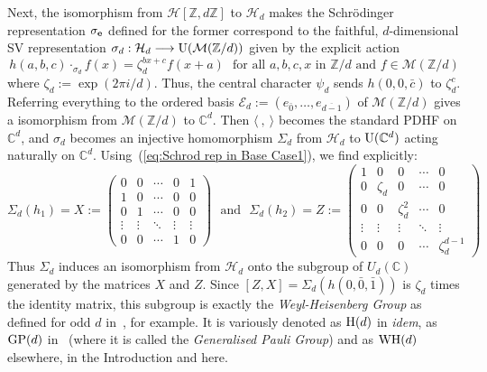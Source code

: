 \documentclass[12pt]{article}
\newcounter{example}[section]
\newcommand{\addwords}[1]{\ \ \ \mbox{#1}}
\newcommand{\bbC}{\ensuremath{\mathbb{C}}}\newcommand{\bbCp}{\ensuremath{\mathbb{C}_p}}
\newcommand{\bbZ}{\ensuremath{\mathbb{Z}}}
\newcommand{\be}{\ensuremath{{\bf e}}}
\newcommand{\cE}{\ensuremath{\mathcal{E}}}
\newcommand{\cH}{\ensuremath{\mathcal{H}}}
\newcommand{\cM}{\mathcal{M}}
\newcommand{\U}{{\rm U}}
\newcommand{\Zover}[1]{\ensuremath{\bbZ/#1}}
\begin{document}
Next, the isomorphism from $\cH[\bbZ,d\bbZ]$ to $\cH_d$ makes the Schr\"odinger representation $\sigma_\be$ defined for the former correspond to the faithful, $d$-dimensional SV representation
$
\sigma_d: \cH_d \longrightarrow 
\U(\cM(\Zover{d})) 
$
given by the explicit action 
\begin{equation}\label{eq:Schrod rep in Base Case1}
	h(a,b,c)\cdot_{\sigma_d} f(x)=\zeta_d^{bx+c}f(x+a)
	\addwords{for all $a,b,c,x$ in $\Zover{d}$ and $f\in\cM(\Zover{d})$}
\end{equation}
where $\zeta_d:=\exp(2\pi i/d)$. Thus, the 
central character $\psi_d$ sends $h(0,0,\bar c)$ to $\zeta_d^c$. 
Referring everything to the ordered basis $\cE_d:=(e_{\bar{0}},\ldots,e_{\overline{d-1}})$ of $\cM(\Zover{d})$ gives a isomorphism from $\cM(\Zover{d})$ to 
$\bbC^d$. Then $\langle\ ,\ \rangle$ becomes the standard PDHF on $\bbC^d$, and $\sigma_d$ becomes an injective homomorphism  
$\Sigma_d$ from $\cH_d$ to $\U(\bbC^d)$ acting naturally on $\bbC^d$. Using~(\ref{eq:Schrod rep in Base Case1}), we find explicitly:  
\begin{equation}\label{eq:defns of X and Z}
	\Sigma_d(h_1)=X:=
	\begin{pmatrix}
		0&0&\cdots&0&1\\	
		1&0&\cdots&0&0\\
		0&1&\cdots&0&0\\	
		\vdots&\vdots&\ddots&\vdots&\vdots\\	
		0&0&\cdots&1&0
	\end{pmatrix}
	\ \ \ \mbox{and}\ \ \ 
	\Sigma_d(h_2)=Z:=\begin{pmatrix}
		1&0&0&\cdots&0\\	
		0&\zeta_d&0&\cdots&0\\	
		0&0&\zeta_d^2&\cdots&0\\	
		\vdots&\vdots&\vdots&\ddots&\vdots\\	
		0&0&0&\cdots&\zeta_d^{d-1}
	\end{pmatrix}
\end{equation}
Thus $\Sigma_d$ induces an isomorphism from $\cH_d$  onto the 
subgroup of $U_d(\bbC)$ generated by the matrices $X$ and $Z$.
Since $[Z,X]=\Sigma_d(h(0,\bar 0, \bar 1))$ is $\zeta_d$ times the identity matrix, this subgroup is exactly 
the \textit{Weyl-Heisenberg Group} as defined for odd $d$ in~\cite{Kopp IMRN}, for example. It is variously denoted as ${\rm H}(d)$ in \textit{idem}, as ${\rm GP}(d)$ in~\cite{DMA: SICPOVMs and the ECG} (where it is called the \textit{Generalised Pauli Group}) and as ${\rm WH}(d)$ elsewhere, in the Introduction and here.
\end{document}

